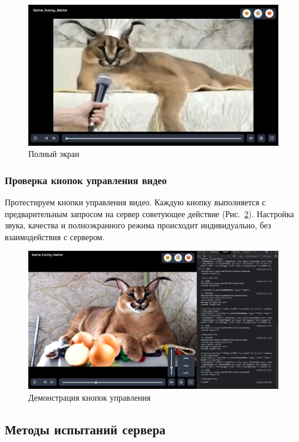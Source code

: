 \documentclass{../../includes/TechDocMultiAuthors}
\begin{document}
    \begin{figure}[H]
        \centering
        \includegraphics[width=0.9\linewidth]{../images/full_screen.png}
        \caption{Полный экран}
        \label{fig:full_screen}
    \end{figure}

    \subsubsection{Проверка кнопок управления видео}

    Протестируем кнопки управления видео.
    Каждую кнопку выполняется с предварительным запросом на сервер советующее действие (Рис.~\ref{fig:actions}).
    Настройка звука, качества и полноэкранного режима происходит индивидуально, без взаимодействия с сервером.

    \begin{figure}[H]
        \centering
        \includegraphics[width=0.9\linewidth]{../images/actions.png}
        \caption{Демонстрация кнопок управления}
        \label{fig:actions}
    \end{figure}

    \subsection{Методы испытаний сервера}
\end{document}
